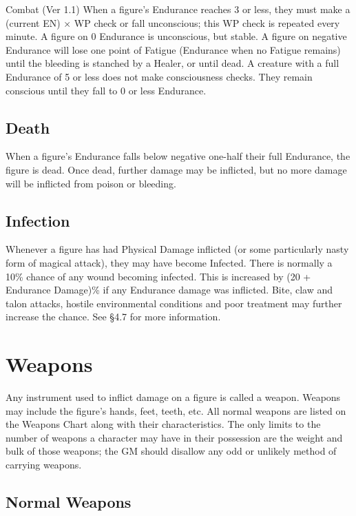 \begin{Chapter}{Combat (Ver 1.1)}
When a figure’s Endurance reaches 3 or less, they must make a (current
EN) × WP check or fall unconscious; this WP check is repeated every
minute.  A figure on 0 Endurance is unconscious, but stable.  A figure
on negative Endurance will lose one point of Fatigue (Endurance when
no Fatigue remains) until the bleeding is stanched by a Healer, or
until dead. A creature with a full Endurance of 5 or less does not
make consciousness checks.  They remain conscious until they fall to 0
or less Endurance.

\subsection{Death}

When a figure’s Endurance falls below negative one-half their full
Endurance, the figure is dead.  Once dead, further damage may be
inflicted, but no more damage will be inflicted from poison or
bleeding.

\subsection{Infection}

Whenever a figure has had Physical Damage inflicted (or some
particularly nasty form of magical attack), they may have become
Infected.  There is normally a 10\% chance of any wound becoming
infected.  This is increased by (20 + Endurance Damage)\% if any
Endurance damage was inflicted.  Bite, claw and talon attacks, hostile
environmental conditions and poor treatment may further increase the
chance. See §4.7 for more information.

\section{Weapons}

Any instrument used to inflict damage on a figure is called a weapon.
Weapons may include the figure’s hands, feet, teeth, etc. All normal
weapons are listed on the Weapons Chart along with their
characteristics.  The only limits to the number of weapons a character
may have in their possession are the weight and bulk of those weapons;
the GM should disallow any odd or unlikely method of carrying weapons.

\subsection{Normal Weapons}


\end{Chapter}
